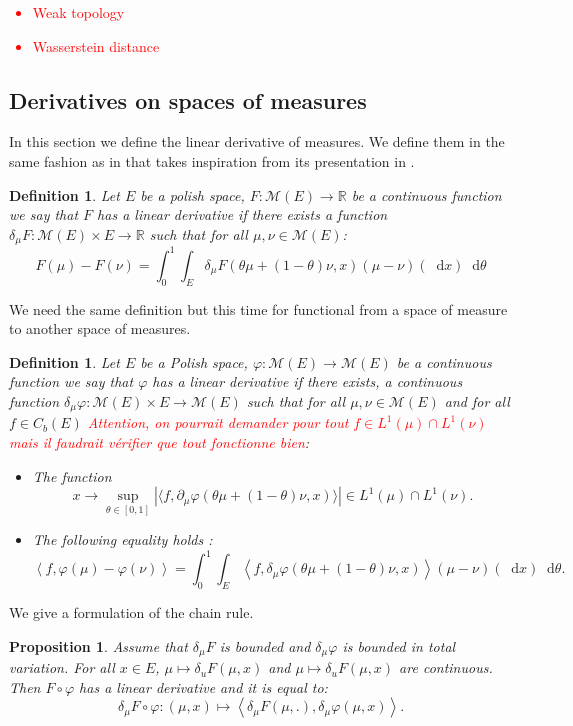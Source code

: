 \documentclass[11pt,a4paper]{article}
\newcommand{\RR}{\mathbb{R}}
\newcommand{\MC}{\mathcal{M}}
\newcommand{\red}[1]{\textcolor{red}{#1}}
\newcommand{\brac}[1]{\left\langle#1\right\rangle}
\newcommand{\dd}{\mathop{}\!\mathrm{d}}
\newtheorem{proposition}[theorem]{Proposition}
\newtheorem{definition}[theorem]{Definition}
\begin{document}
\red{\begin{itemize}
    \item Weak topology
    \item Wasserstein distance
\end{itemize}}

\subsection{Derivatives on spaces of measures}
In this section we define the linear derivative of measures. We define them in the same fashion as in \cite{martiniKolmogorovEquationsSpaces2023} that takes inspiration from its presentation in \cite{cardaliaguet2019master,carmona2018probabilistic}.
\begin{definition}
    Let $E$ be a polish space, $F: \MC(E) \to \RR$ be a continuous function we say that $F$ has a linear derivative if there exists a function $\delta_{\mu}F :\MC(E) \times E\to \RR $ such that for all $\mu,\nu \in \MC(E)$:
    \[ F(\mu) - F(\nu) = \int_0^1 \int_E \delta_\mu F(\theta \mu + (1-\theta)\nu,x)\left(\mu - \nu\right)(\dd x)\dd \theta\]
\end{definition}
We need the same definition but this time for functional from a space of measure to another space of measures.
\begin{definition}
     Let $E$ be a Polish space, $\varphi: \MC(E) \to \MC(E)$ be a continuous function we say that $\varphi$ has a linear derivative if there exists, a continuous function $\delta_{\mu}\varphi :\MC(E) \times E\to \MC(E)$ such that for all $\mu,\nu \in \MC(E)$ and for all $f\in C_b(E)$ \red{Attention, on pourrait demander pour tout $f\in L^1(\mu) \cap L^1(\nu)$ mais il faudrait vérifier que tout fonctionne bien}:
     \begin{itemize}
         \item The function
         \[x\to \sup_{\theta \in [0,1]} |\langle f, \partial_\mu\varphi(\theta \mu + (1-\theta) \nu,x) \rangle| \in L^1(\mu) \cap L^1(\nu).\]
        \item The following equality holds :
            \[ \left\langle f,\varphi(\mu) - \varphi(\nu) \right\rangle= \int_0^1 \int_E \left\langle f,\delta_\mu \varphi(\theta \mu + (1-\theta)\nu,x)\right\rangle\left(\mu - \nu\right)(\dd x)\dd \theta.\]
     \end{itemize}
\end{definition}
We give a formulation of the chain rule.
\begin{proposition}
    Assume that $\delta_\mu F$ is bounded and $\delta_\mu\varphi$ is bounded in total variation. For all \(x\in E\), \(\mu \mapsto \delta_u F(\mu,x)\) and \(\mu \mapsto \delta_u F(\mu,x)\) are continuous. Then \(F\circ \varphi\) has a linear derivative and it is equal to:
    \[
    \delta_\mu F\circ \varphi : \left(\mu,x \right) \mapsto \brac{\delta_\mu  F(\mu,.),\delta_\mu\varphi(\mu,x)}.
    \]
\end{proposition}
\end{document}

